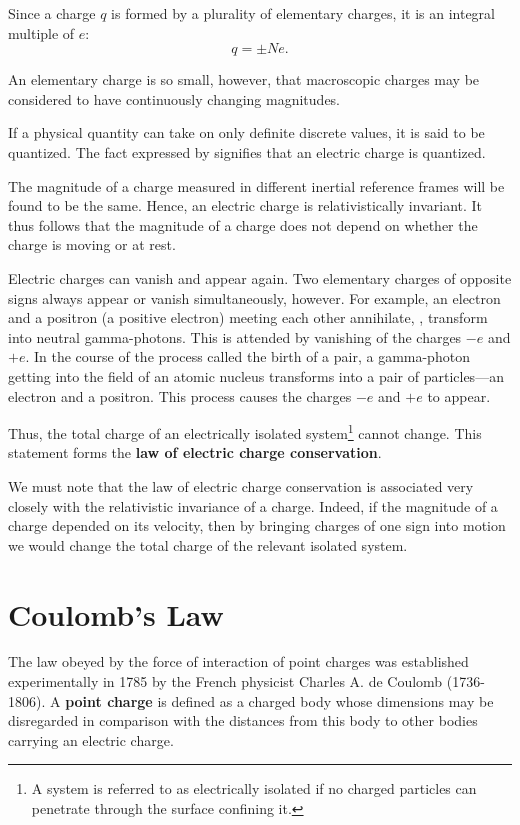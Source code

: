 Since a charge $q$ is formed by a plurality of elementary charges, it is an integral multiple of $e$:
\begin{equation}\label{eq:1_1}
	q = \pm N e.
\end{equation}

\noindent
An elementary charge is so small, however, that macroscopic charges may be considered to have continuously changing magnitudes.

If a physical quantity can take on only definite discrete values, it is said to be quantized. The fact expressed by  signifies that an electric charge is quantized.

The magnitude of a charge measured in different inertial reference frames will be found to be the same. Hence, an electric charge is relativistically invariant. It thus follows that the magnitude of a charge does not depend on whether the charge is moving or at rest.

Electric charges can vanish and appear again. Two elementary charges of opposite signs always appear or vanish simultaneously, however. For example, an electron and a positron (a positive electron) meeting each other annihilate, \ie, transform into neutral gamma-photons. This is attended by vanishing of the charges $-e$ and $+e$. In the course of the process called the birth of a pair, a gamma-photon getting into the field of an atomic nucleus transforms into a pair of particles---an electron and a positron. This process causes the charges $-e$ and $+e$ to appear.

Thus, the total charge of an electrically isolated system\footnote{A system is referred to as electrically isolated if no charged particles can penetrate through the surface confining it.} cannot change. This statement forms the \textbf{law of electric charge conservation}.

We must note that the law of electric charge conservation is associated very closely with the relativistic invariance of a charge. Indeed, if the magnitude of a charge depended on its velocity, then by bringing charges of one sign into motion we would change the total charge of the relevant isolated system.

\section{Coulomb's Law}\label{sec:1_2}

The law obeyed by the force of interaction of point charges was established experimentally in 1785 by the French physicist Charles A. de Coulomb (1736-1806). A \textbf{point charge} is defined as a charged body whose dimensions may be disregarded in comparison with the distances from this body to other bodies carrying an electric charge.

